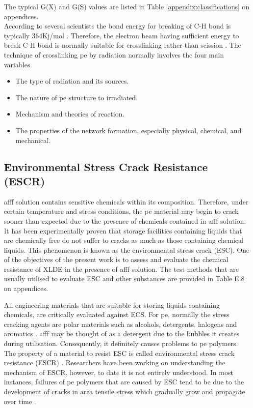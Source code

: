 The typical G(X) and G(S) values are listed in Table \ref{appendix:classifications} on appendices. \\

According to several scientists the bond energy for breaking of C-H bond is typically 364Kj/mol \cite{meola2005cross}. Therefore, the electron beam having sufficient energy to break C-H bond is normally suitable for crosslinking rather than scission \cite{meola2005cross}. The technique of crosslinking \acrshort{pe} by radiation normally involves the four main variables. 

\begin{itemize}
    \item The type of radiation and its sources.
    \item The nature of \acrshort{pe} structure to irradiated.
    \item Mechanism and theories of reaction.
    \item The properties of the network formation, especially physical, chemical, and mechanical. 
\end{itemize}

\subsection{Environmental Stress Crack Resistance (ESCR)}
\acrshort{afff} solution contains sensitive chemicals within its composition. Therefore, under certain temperature and stress conditions, the \acrshort{pe} material may begin to crack sooner than expected due to the presence of chemicals contained in \acrshort{afff} solution. It has been experimentally proven that storage facilities containing liquids that are chemically free do not suffer to cracks as much as those containing chemical liquids. This phenomenon is known as the environmental stress crack (ESC). One of the objectives of the present work is to assess and evaluate the chemical resistance of XLDE in the presence of \acrshort{afff} solution. The test methods that are usually utilised to evaluate ESC and other substances are provided in Table E.8 on appendices. 

All engineering materials that are suitable for storing liquids containing chemicals, are critically evaluated against ECS. For \acrshort{pe}, normally the stress cracking agents are polar materials such as alcohols, detergents, halogens and aromatics \cite{gabriel1998history}. \acrshort{afff} may be thought of as a detergent due to the bubbles it creates during utilisation. Consequently, it definitely causes problems to \acrshort{pe} polymers. The property of a material to resist ESC is called environmental stress crack resistance (ESCR) \cite{gabriel1998history}. Researchers have been working on understanding the mechanism of ESCR, however, to date it is not entirely understood. In most instances, failures of \acrshort{pe} polymers that are caused by ESC tend to be due to the development of cracks in area tensile stress which gradually grow and propagate over time \cite{meola2005cross}. 

